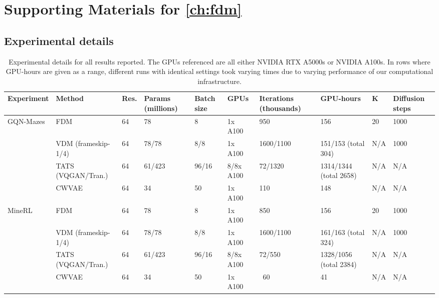 \chapter{Supporting Materials for \cref{ch:fdm}}

\section{Experimental details}
\begin{table}[h]
  \tiny
  \caption{Experimental details for all results reported. The GPUs referenced are all either NVIDIA RTX A5000s or NVIDIA A100s. In rows where GPU-hours are given as a range, different runs with identical settings took varying times due to varying performance of our computational infrastructure.}
  \label{tab:fdm-experimental-details}
  \centering
  \begin{tabular}{p{1.1cm}llp{0.9cm}p{0.6cm}lp{1cm}llp{0.7cm}}
    \toprule
     Experiment  & Method & Res.  & Params (millions)  & Batch size  &  GPUs  & Iterations (thousands)  &  GPU-hours &  K  & Diffusion steps   \\
    \midrule
    \multirow{4}{*}{GQN-Mazes}         &  FDM                       & 64    & 78    & 8     & 1x A100   & 950       & 156      & 20    & 1000      \\
                                       &  VDM (frameskip-1/4)       & 64    & 78/78 & 8/8   & 1x A100   & 1600/1100 & 151/153 (total 304)   & N/A  & 1000      \\
                                       &  TATS (VQGAN/Tran.)       & 64    & 61/423     & 96/16 & 8/8x A100 & 72/1320   & 1314/1344 (total 2658)    & N/A  & N/A      \\
                                       &  CWVAE                     & 64    & 34    & 50    & 1x A100   & 110    & 148   & N/A   & N/A       \\
   \midrule
    \multirow{4}{*}{MineRL}            &  FDM                       & 64    & 78    & 8     & 1x A100   & 850       & 156      & 20    & 1000      \\
                                       &  VDM (frameskip-1/4)       & 64    & 78/78 & 8/8   & 1x A100   & 1600/1100 & 161/163 (total 324)   & N/A  & 1000      \\
                                       &  TATS (VQGAN/Tran.)       & 64    & 61/423     & 96/16 & 8/8x A100   & 72/550    & 1328/1056 (total 2384)     & N/A  & N/A      \\
                                       &  CWVAE                     & 64    & 34    & 50    & 1x A100   & ~60   & 41    & N/A    & N/A      \\

\end{tabular}
\end{table}
